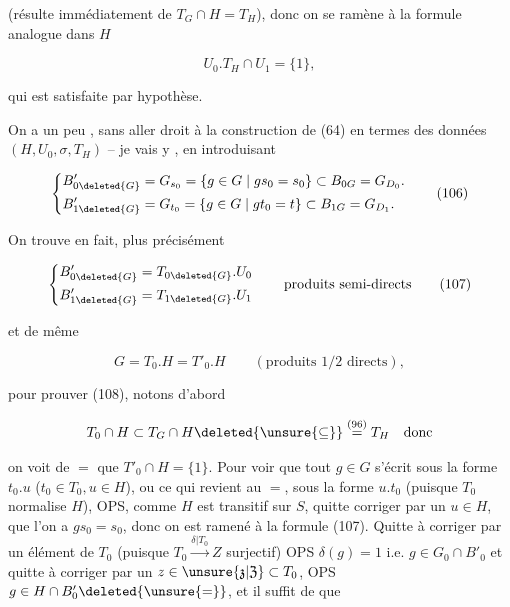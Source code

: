 (résulte immédiatement de $T_G\cap H=T_H$), donc on se  ramène à la formule analogue dans $H$

\[U_0.T_H\cap U_1=\{1\},\]

qui est satisfaite par hypothèse.

On a un peu , sans aller droit à la construction de (64) en termes des données $(H,U_0,\sigma,T_H)$ -- je vais y , en introduisant

\[\left\{\begin{aligned}
B'_{0\deleted{G}}&=G_{s_0}=\{g\in G\mid gs_0=s_0\}\subset B_{0G}=G_{D_0}.\\
B'_{1\deleted{G}}&=G_{t_0}=\{g\in G\mid gt_0=t\}\subset B_{1G}=G_{D_1}.
\end{aligned}\right.\tag*{(106)}\]

On trouve en fait, plus précisément

\[\left\{\begin{aligned}
B'_{0\deleted{G}}&=T_{0\deleted{G}}.U_0\\
B'_{1\deleted{G}}&=T_{1\deleted{G}}.U_1
\end{aligned}\right.\qquad\text{produits semi-directs}\tag*{(107)}\]



et de même

\[G=T_0.H=T'_0.H\qquad(\text{produits }1/2\text{ directs}),\tag*{(108)}\]

pour prouver (108), notons d'abord

\[T_0\cap H\subset T_G\cap H\deleted{\unsure{\subseteq}}\overset{(96)}{=}T_H\quad\text{donc}\]


on voit de $=$ que $T'_0\cap H=\{1\}$. Pour voir que tout $g\in G$ s'écrit sous la forme $t_0.u$ ($t_0\in T_0,u\in H$), ou ce qui revient au $=$, sous la forme $u.t_0$ (puisque $T_0$ normalise $H$), OPS, comme $H$ est transitif sur $S$, quitte   corriger  par un $u\in H$, que l'on a $gs_0=s_0$, donc on est ramené à la formule (107). Quitte à corriger par un élément de $T_0$ (puisque $T_0\xrightarrow{\delta|T_0} Z$ surjectif) OPS $\delta(g)=1$ i.e. $g\in G_0\cap B'_0$ et  quitte à corriger par un $z\in\unsure{\mathfrak{z}|\mathfrak{Z}}\subset T_0$, OPS $g\in H\cap B'_0\deleted{\unsure{=}}$, et il suffit de   que

